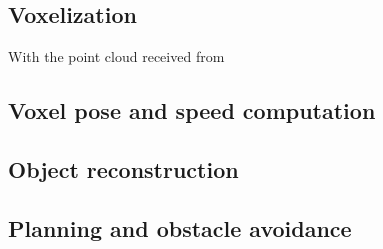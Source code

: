 \subsection{Voxelization}\label{ch:chapter05_01_03}

With the point cloud received from

  
\subsection{Voxel pose and speed computation}\label{ch:chapter05_01_04}


% 
% 
% 
% 
% 
% 
% 
%   
% 

\subsection{Object reconstruction}\label{ch:chapter05_01_05}

% 
% 

\subsection{Planning and obstacle avoidance}\label{ch:chapter05_01_06}



 